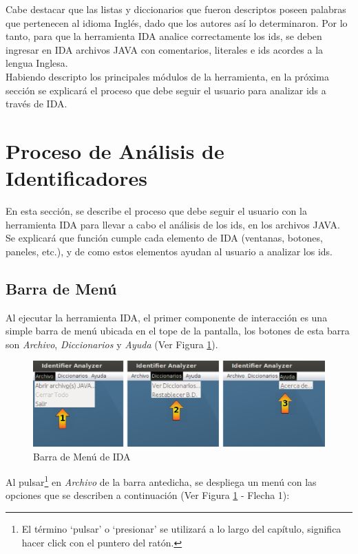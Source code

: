 Cabe destacar que las listas y diccionarios que fueron descriptos poseen palabras que pertenecen al idioma Inglés, dado que los autores así lo determinaron. Por lo tanto, para que la herramienta IDA analice correctamente los ids, se deben ingresar en IDA archivos JAVA con comentarios, literales e ids acordes a la lengua Inglesa.\\ 

Habiendo descripto los principales módulos de la herramienta, en la próxima sección se explicará el proceso que debe seguir el usuario para analizar ids a través de IDA.
 
\section{Proceso de Análisis de Identificadores}

En esta sección, se describe el proceso que debe seguir el usuario con la herramienta IDA para llevar a cabo el análisis de los ids, en los archivos JAVA. Se explicará que función cumple cada elemento de IDA (ventanas, botones, paneles, etc.), y de como estos elementos ayudan al usuario a analizar los ids.

\subsection{Barra de Menú}

Al ejecutar la herramienta IDA, el primer componente de interacción es una simple barra de menú ubicada en el tope de la pantalla, los botones de esta barra son \textit{Archivo}, \textit{Diccionarios} y \textit{Ayuda} (Ver Figura \ref{ida1}). 

\begin{figure}[t] %
\centerline{%
\includegraphics[scale= 0.46]{./cap4/ida_01.png}
}
\caption{Barra de Menú de IDA}
\label{ida1}
\end{figure}

Al pulsar\footnote[1]{El término `pulsar' o `presionar' se utilizará a lo largo del capítulo, significa hacer click con el puntero del ratón.} en \textit{Archivo} de la barra antedicha, se despliega un menú con las opciones que se describen a continuación (Ver Figura \ref{ida1} - Flecha 1):

